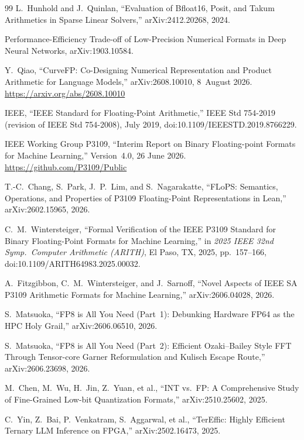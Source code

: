 \begin{thebibliography}{99}
 L.~Hunhold and J.~Quinlan, ``Evaluation of
Bfloat16, Posit, and Takum Arithmetics in Sparse Linear Solvers,''
arXiv:2412.20268, 2024.

 Performance-Efficiency Trade-off of Low-Precision Numerical Formats in Deep Neural Networks, arXiv:1903.10584.

 Y.~Qiao, ``CurveFP: Co-Designing Numerical Representation and Product Arithmetic for Language Models,'' arXiv:2608.10010, 8~August 2026. \url{https://arxiv.org/abs/2608.10010}

 IEEE, ``IEEE Standard for Floating-Point Arithmetic,''
IEEE Std 754-2019 (revision of IEEE Std 754-2008), July 2019,
doi:10.1109/IEEESTD.2019.8766229.

 IEEE Working Group P3109, ``Interim Report on Binary
Floating-point Formats for Machine Learning,'' Version~4.0, 26 June 2026.
\url{https://github.com/P3109/Public}

 T.-C.~Chang, S.~Park, J.~P.~Lim, and S.~Nagarakatte,
``FLoPS: Semantics, Operations, and Properties of P3109 Floating-Point
Representations in Lean,'' arXiv:2602.15965, 2026.

 C.~M.~Wintersteiger, ``Formal Verification of the
IEEE P3109 Standard for Binary Floating-Point Formats for Machine Learning,'' in
\emph{2025 IEEE 32nd Symp.\ Computer Arithmetic (ARITH)}, El Paso, TX, 2025,
pp.~157--166, doi:10.1109/ARITH64983.2025.00032.

 A.~Fitzgibbon, C.~M.~Wintersteiger, and
J.~Sarnoff, ``Novel Aspects of IEEE SA P3109 Arithmetic Formats for Machine
Learning,'' arXiv:2606.04028, 2026.

 S.~Matsuoka, ``FP8 is All You Need (Part~1):
Debunking Hardware FP64 as the HPC Holy Grail,'' arXiv:2606.06510, 2026.

 S.~Matsuoka, ``FP8 is All You Need (Part~2):
Efficient Ozaki--Bailey Style FFT Through Tensor-core Garner Reformulation and
Kulisch Escape Route,'' arXiv:2606.23698, 2026.

 M.~Chen, M.~Wu, H.~Jin, Z.~Yuan, et al., ``INT vs.\ FP:
A Comprehensive Study of Fine-Grained Low-bit Quantization Formats,''
arXiv:2510.25602, 2025.

 C.~Yin, Z.~Bai, P.~Venkatram, S.~Aggarwal, et al.,
``TerEffic: Highly Efficient Ternary LLM Inference on FPGA,'' arXiv:2502.16473,
2025.


\end{thebibliography}
